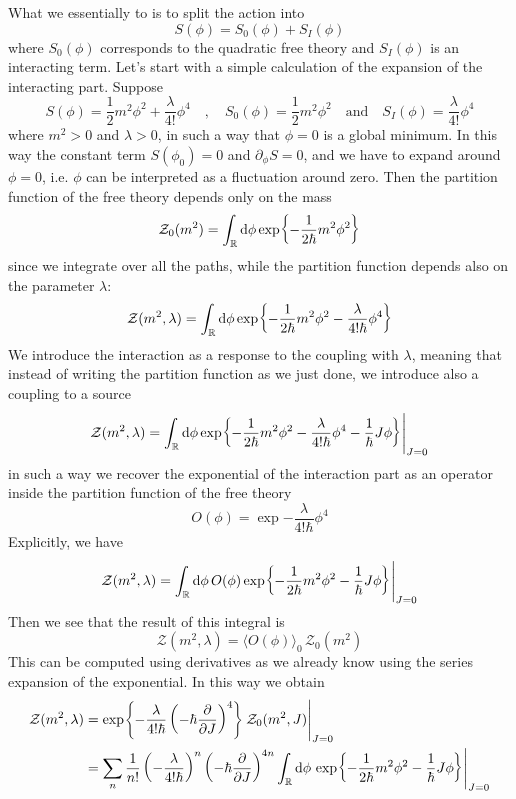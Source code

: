 \documentclass[../main/main.tex]{subfiles}
\begin{document}
What we essentially to is to split the action into 
\[S(\phi)=S_0(\phi)+S_I(\phi)\]
where $S_0(\phi)$ corresponds to the quadratic free theory and $S_I(\phi)$ is an interacting term. Let's start with a simple calculation of the expansion of the interacting part. Suppose
\begin{equation}\label{eqn:action-examp-0d-perturb}
S(\phi)=\frac12m^2\phi^2+\frac\lambda{4!}\phi^4\quad,\quad S_0(\phi)=\frac12m^2\phi^2\quad\text{and}\quad S_I(\phi)=\frac\lambda{4!}\phi^4
\end{equation}
where $m^2>0$ and $\lambda>0$, in such a way that $\phi=0$ is a global minimum. In this way the constant term $S(\phi_0)=0$ and $\partial_\phi S=0$, and we have to expand around $\phi=0$, i.e. $\phi$ can be interpreted as a fluctuation around zero. Then the partition function of the free theory depends only on the mass
\[\mathcal Z_0(m^2)=\int_{\mathbb{R}}\textup{d}\phi \exp{-\frac1{2\hbar}m^2\phi^2}\]
since we integrate over all the paths, while the partition function depends also on the parameter $\lambda$:
\[\mathcal Z(m^2,\lambda)=\int_{\mathbb{R}}\textup{d}\phi \exp{-\frac1{2\hbar}m^2\phi^2-\frac\lambda{4!\hbar}\phi^4}\]
We introduce the interaction as a response to the coupling with $\lambda$, meaning that instead of writing the partition function as we just done, we introduce also a coupling to a source 
\begin{equation}\label{eqn:corr-exp-perturb-exp}
\mathcal Z(m^2,\lambda)=\int_{\mathbb{R}}\textup{d}\phi \exp{-\frac1{2\hbar}m^2\phi^2-\frac\lambda{4!\hbar}\phi^4-\frac1\hbar J\phi}\Bigg\vert_{J=0}
\end{equation}
in such a way we recover the exponential of the interaction part as an operator inside the partition function of the free theory
\[O(\phi)=\exp{-\frac\lambda{4!\hbar}\phi^4}\]
Explicitly, we have
\[\mathcal Z(m^2,\lambda)=\int_{\mathbb{R}}\textup{d}\phi \,O(\phi)\exp{-\frac1{2\hbar}m^2\phi^2-\frac1\hbar J\phi}\Bigg\vert_{J=0}\]
Then we see that the result of this integral is
\[\mathcal Z(m^2,\lambda)=\langle O(\phi)\rangle_0\,\mathcal Z_0(m^2)\]
This can be computed using derivatives as we already know using the series expansion of the exponential. In this way we obtain
\begin{align*}
\mathcal Z(m^2,\lambda)
&=\exp{-\frac\lambda{4!\hbar}\left(-\hbar\frac\partial{\partial J}\right)^4}\,\mathcal Z_0(m^2,J)\Bigg\vert_{J=0}\\
&=\sum_n\frac1{n!}\left(-\frac\lambda{4!\hbar}\right)^n\left(-\hbar\frac\partial{\partial J}\right)^{4n}\int_{\mathbb{R}}\textup{d}\phi \,\exp{-\frac1{2\hbar}m^2\phi^2-\frac1\hbar J\phi}\Bigg\vert_{J=0}
\end{align*}
\end{document}

